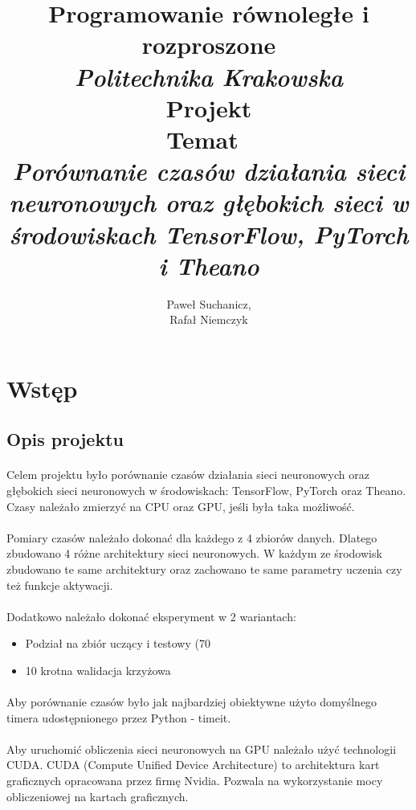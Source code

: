 \documentclass[a4paper,11pt]{article}
\title{
	\textbf{Programowanie równoległe i rozproszone}\vspace{40pt}
	\\\textit{Politechnika Krakowska} \\\vspace{40pt}
	\textup{Projekt}\vspace{25pt}
	\\\textup{Temat}\
	\\\textit{Porównanie czasów działania sieci neuronowych oraz głębokich sieci w środowiskach TensorFlow, PyTorch i Theano} \\\vspace{26pt}
	\vspace{270pt}
}
\author{
	Paweł Suchanicz,\\
	Rafał Niemczyk
}
\begin{document}
\begin{titlepage}
\maketitle
\end{titlepage}

\begin{center}
\tableofcontents
\end{center}
\newpage
\section{Wstęp}
\subsection{Opis projektu}
\paragraph{}Celem projektu było porównanie czasów działania sieci neuronowych oraz głębokich sieci neuronowych w środowiskach: TensorFlow, PyTorch oraz Theano. Czasy należało zmierzyć na CPU oraz GPU, jeśli była taka możliwość. 
\paragraph{}Pomiary czasów należało dokonać dla każdego z 4 zbiorów danych. Dlatego zbudowano 4 różne architektury sieci neuronowych. W każdym ze środowisk zbudowano te same architektury oraz zachowano te same parametry uczenia czy też funkcje aktywacji.
\paragraph{}Dodatkowo należało dokonać eksperyment w 2 wariantach:
\begin{itemize}
\item Podział na zbiór uczący i testowy (70%
\item 10 krotna walidacja krzyżowa
\end{itemize}
\paragraph{}Aby porównanie czasów było jak najbardziej obiektywne użyto domyślnego timera udostępnionego przez Python - timeit.
\paragraph{}Aby uruchomić obliczenia sieci neuronowych na GPU należało użyć technologii CUDA. CUDA (Compute Unified Device Architecture) to architektura kart graficznych opracowana przez firmę Nvidia. Pozwala na wykorzystanie mocy obliczeniowej na kartach graficznych.
\end{document}
